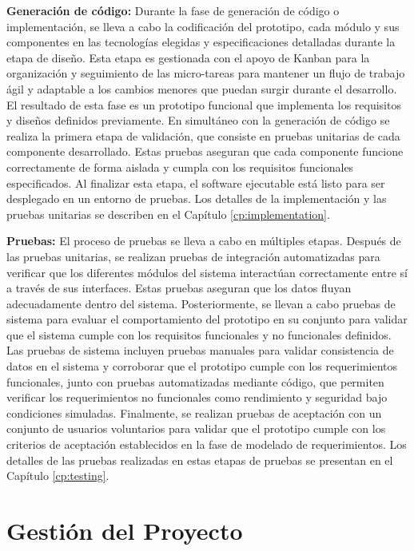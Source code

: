 \textbf{Generación de código:}
Durante la fase de generación de código o implementación, se lleva a cabo la codificación del prototipo, cada módulo y sus componentes en las tecnologías elegidas y especificaciones detalladas durante la etapa de diseño.
Esta etapa es gestionada con el apoyo de Kanban para la organización y seguimiento de las micro-tareas para mantener un flujo de trabajo ágil y adaptable a los cambios menores que puedan surgir durante el desarrollo.
El resultado de esta fase es un prototipo funcional que implementa los requisitos y diseños definidos previamente.
En simultáneo con la generación de código se realiza la primera etapa de validación, que consiste en pruebas unitarias de cada componente desarrollado.
Estas pruebas aseguran que cada componente funcione correctamente de forma aislada y cumpla con los requisitos funcionales especificados.
Al finalizar esta etapa, el software ejecutable está listo para ser desplegado en un entorno de pruebas.
Los detalles de la implementación y las pruebas unitarias se describen en el Capítulo \ref{cp:implementation}.

\textbf{Pruebas:}
El proceso de pruebas se lleva a cabo en múltiples etapas.
Después de las pruebas unitarias, se realizan pruebas de integración automatizadas para verificar que los diferentes módulos del sistema interactúan correctamente entre sí a través de sus interfaces.
Estas pruebas aseguran que los datos fluyan adecuadamente dentro del sistema.
Posteriormente, se llevan a cabo pruebas de sistema para evaluar el comportamiento del prototipo en su conjunto para validar que el sistema cumple con los requisitos funcionales y no funcionales definidos.
Las pruebas de sistema incluyen pruebas manuales para validar consistencia de datos en el sistema y corroborar que el prototipo cumple con los requerimientos funcionales, junto con pruebas automatizadas mediante código, que permiten verificar los requerimientos no funcionales como rendimiento y seguridad bajo condiciones simuladas.
Finalmente, se realizan pruebas de aceptación con un conjunto de usuarios voluntarios para validar que el prototipo cumple con los criterios de aceptación establecidos en la fase de modelado de requerimientos.
Los detalles de las pruebas realizadas en estas etapas de pruebas se presentan en el Capítulo \ref{cp:testing}.

\section{Gestión del Proyecto}

